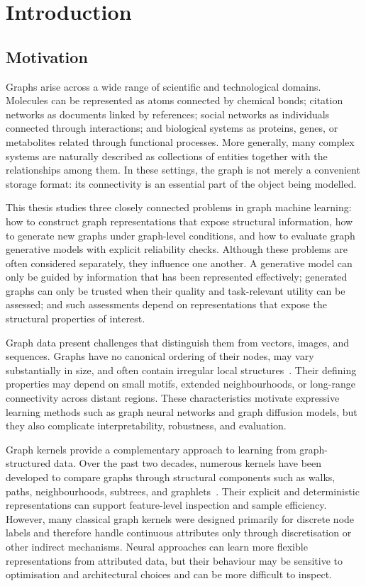 \chapter{Introduction}
\label{ch:intro}

\section{Motivation}
\label{sec:intro:motivation}

Graphs arise across a wide range of scientific and technological domains. Molecules can be represented as atoms connected by chemical bonds; citation networks as documents linked by references; social networks as individuals connected through interactions; and biological systems as proteins, genes, or metabolites related through functional processes. More generally, many complex systems are naturally described as collections of entities together with the relationships among them. In these settings, the graph is not merely a convenient storage format: its connectivity is an essential part of the object being modelled.

This thesis studies three closely connected problems in graph machine learning:
how to construct graph representations that expose structural information, how
to generate new graphs under graph-level conditions, and how to evaluate graph
generative models with explicit reliability checks. Although these problems are
often considered separately, they influence one another. A generative model can
only be guided by information that has been represented effectively; generated
graphs can only be trusted when their quality and task-relevant utility can be
assessed; and such assessments depend on representations that expose the
structural properties of interest.

Graph data present challenges that distinguish them from vectors, images, and sequences. Graphs have no canonical ordering of their nodes, may vary substantially in size, and often contain irregular local structures~\citep{bronstein2017geometric}. Their defining properties may depend on small motifs, extended neighbourhoods, or long-range connectivity across distant regions. These characteristics motivate expressive learning methods such as graph neural networks and graph diffusion models, but they also complicate interpretability, robustness, and evaluation.

Graph kernels provide a complementary approach to learning from graph-struc\-tured data. Over the past two decades, numerous kernels have been developed to compare graphs through structural components such as walks, paths, neighbourhoods, subtrees, and graphlets~\citep{nikolentzos2021graph}. Their explicit and deterministic representations can support feature-level inspection and sample efficiency. However, many classical graph kernels were designed primarily for discrete node labels and therefore handle continuous attributes only through discretisation or other indirect mechanisms. Neural approaches can learn more flexible representations from attributed data, but their behaviour may be sensitive to optimisation and architectural choices and can be more difficult to inspect.

